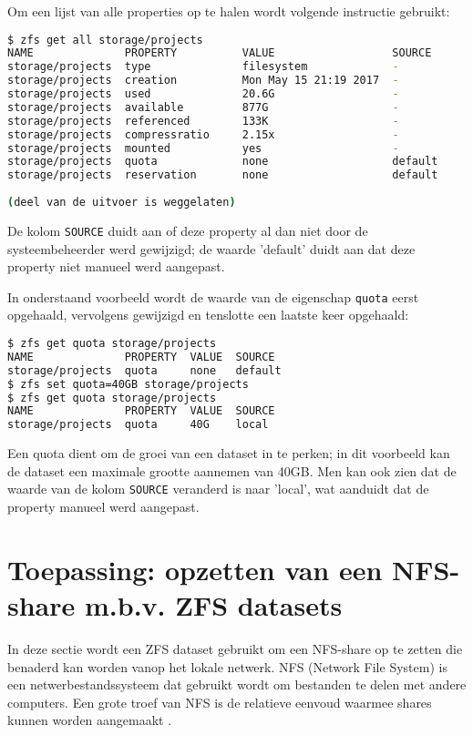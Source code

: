 Om een lijst van alle properties op te halen wordt volgende instructie gebruikt: 

\begin{lstlisting}[language=bash,style=command_style] 
$ zfs get all storage/projects
NAME              PROPERTY          VALUE                  SOURCE
storage/projects  type              filesystem             -
storage/projects  creation          Mon May 15 21:19 2017  -
storage/projects  used              20.6G                  -
storage/projects  available         877G                   -
storage/projects  referenced        133K                   -
storage/projects  compressratio     2.15x                  -
storage/projects  mounted           yes                    -
storage/projects  quota             none                   default
storage/projects  reservation       none                   default
  
(deel van de uitvoer is weggelaten)
\end{lstlisting}

De kolom \texttt{SOURCE} duidt aan of deze property al dan niet door de systeembeheerder werd gewijzigd; de waarde 'default' duidt aan dat deze property niet manueel werd aangepast.

\clearpage

In onderstaand voorbeeld wordt de waarde van de eigenschap \texttt{quota} eerst opgehaald, vervolgens gewijzigd en tenslotte een laatste keer opgehaald:

\begin{lstlisting}[language=bash,style=command_style] 
$ zfs get quota storage/projects
NAME              PROPERTY  VALUE  SOURCE
storage/projects  quota     none   default
$ zfs set quota=40GB storage/projects
$ zfs get quota storage/projects
NAME              PROPERTY  VALUE  SOURCE
storage/projects  quota     40G    local
\end{lstlisting}

Een quota dient om de groei van een dataset in te perken; in dit voorbeeld kan de dataset een maximale grootte aannemen van 40GB. Men kan ook zien dat de waarde van de kolom \texttt{SOURCE} veranderd is naar 'local', wat aanduidt dat de property manueel werd aangepast.

\section{Toepassing: opzetten van een NFS-share m.b.v. ZFS datasets}

In deze sectie wordt een ZFS dataset gebruikt om een NFS-share op te zetten die benaderd kan worden vanop het lokale netwerk. NFS (Network File System) is een netwerbestandssysteem dat gebruikt wordt om bestanden te delen met andere computers. Een grote troef van NFS is de relatieve eenvoud waarmee shares kunnen worden aangemaakt \autocite{FBSDDP2017}.

